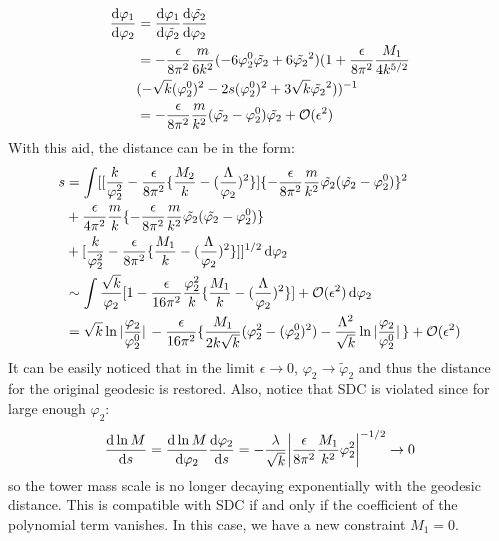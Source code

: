 \begin{align} 
    \begin{split}
    \dv{\varphi_{1}}{\varphi_{2}} &= \dv{\varphi_{1}}{\tilde{\varphi_{2}}}\dv{\tilde{\varphi_{2}}}{\varphi_{2}}  \\
    &= -\frac{\epsilon}{8\pi^{2}}\frac{m}{6k^{2}} (-6\varphi_{2}^{0} \tilde{\varphi_{2}} + 6 \tilde{\varphi_{2}}^{2})(1+\frac{\epsilon}{8\pi^{2}} \frac{M_{1}}{4k^{5/2}} \\
    & (-\sqrt{k}(\varphi_{2}^{0} )^{2} - 2s(\varphi_{2}^{0}) ^{2} + 3\sqrt{k} \tilde{\varphi_{2}}^{2}))^{-1}  \\
    &= -\frac{\epsilon}{8\pi^{2}}\frac{m}{k^{2}} (\tilde{\varphi_{2}} - \varphi_{2}^{0})\tilde{\varphi_{2}} + \mathcal{O}(\epsilon ^{2})
    \end{split}
\end{align}
With this aid, the distance can be in the form:
\begin{align}
    \begin{split}
    s &=\int [[\frac{k}{\varphi_{2}^{2}} -\frac{\epsilon}{8\pi^{2}}\lbrace \frac{M_2}{k} - (\frac{\Lambda}{\varphi_{2}})^{2}\rbrace] \lbrace -\frac{\epsilon}{8\pi^{2}} \frac{m}{k^{2}} \tilde{\varphi_{2}}(\tilde{\varphi_{2}} -\varphi_{2}^{0}) \rbrace ^{2} \\
    & + \frac{\epsilon}{4\pi^{2}}\frac{m}{k}\lbrace -\frac{\epsilon}{8\pi^{2}} \frac{m}{k^{2}} \tilde{\varphi_{2}}(\tilde{\varphi_{2}} -\varphi_{2}^{0}) \rbrace  \\
    & + [\frac{k}{\varphi_{2}^{2}} -\frac{\epsilon}{8\pi^{2}}\lbrace \frac{M_1}{k} - (\frac{\Lambda}{\varphi_{2}})^{2}\rbrace]]^{1/2} \dd {\varphi_{2}}  \\
    &\sim \int \frac{\sqrt{k}}{\varphi_{2}} [1- \frac{\epsilon}{16\pi^{2}} \frac{\varphi_{2}^{2}}{k} \lbrace\frac{M_{1}}{k} - (\frac{\Lambda}{\varphi_{2}})^{2} \rbrace ] + \order*{\epsilon^{2}} \dd{\varphi_{2}} \\
    &= \sqrt{k} \ln\abs*{\frac{\varphi_{2}}{\varphi_{2}^{0}}} - \frac{\epsilon}{16\pi^{2}}\lbrace \frac{M_{1}}{2k\sqrt{k}}(\varphi_{2}^{2} - (\varphi_{2}^{0})^{2}) - \frac{\Lambda^{2}}{\sqrt{k}}\ln\abs*{\frac{\varphi_{2}}{\varphi_{2}^{0}}} \rbrace + \order*{\epsilon ^{2}}
    \end{split}
\end{align}
It can be easily noticed that in the limit $\epsilon \to 0$, $\varphi_{2} \to \tilde \varphi_{2}$ and thus the distance for the original geodesic is restored. Also, notice that SDC is violated since for large enough $\varphi_{2}$:
\begin{align}
    \dv{\ln M}{s} = \dv{\ln M}{\varphi_{2}}\dv{\varphi_{2}}{s} = -\frac{\lambda}{\sqrt{k}}\abs{\frac{\epsilon}{8\pi^{2}} \frac{M_{1}}{k^{2}}\varphi_{2}^{2}}^{-1/2} \rightarrow 0
\end{align}
so the tower mass scale is no longer decaying exponentially with the geodesic distance. This is compatible with SDC if and only if the coefficient of the polynomial term vanishes. In this case, we have a new constraint $M_{1} = 0$. 

